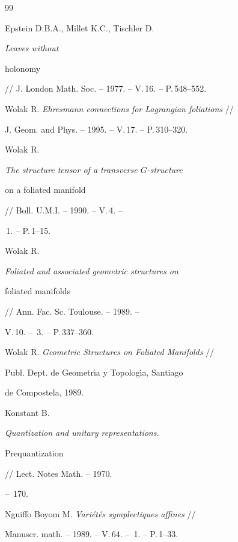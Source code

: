 \begin{thebibliography}{99}


Epstein D.B.A., Millet K.C., Tischler D. {\em Leaves without


holonomy} // J. London Math. Soc. -- 1977. -- V.\,16. -- P.\,548--552.







Wolak R. {\em Ehresmann connections for Lagrangian foliations} //


J. Geom. and Phys. -- 1995. -- V.\,17. -- P.\,310--320.







Wolak R. {\em The structure tensor of a transverse $G$-structure


on a foliated manifold} // Boll. U.M.I. -- 1990. -- V.\,4. --


\No\,1. -- P.\,1--15.







Wolak R. {\em Foliated and associated geometric structures on


foliated manifolds} // Ann. Fac. Sc. Toulouse. -- 1989. --


V.\,10. -- \No\,3. -- P.\,337--360.







Wolak R. {\em Geometric Structures on Foliated Manifolds} //


Publ. Dept. de Geometr\'{\i}a y Topolog\'{\i}a, Santiago


de Compostela, 1989.







Konstant B. {\em Quantization and unitary representations.


Prequantization} // Lect. Notes Math. -- 1970.


-- \No\,170.







Nguiffo Boyom M. {\em Vari\'et\'es symplectiques affines} //


Manuscr. math. -- 1989. -- V.\,64. -- \No\,1. -- P.\,1--33.






\end{thebibliography}
